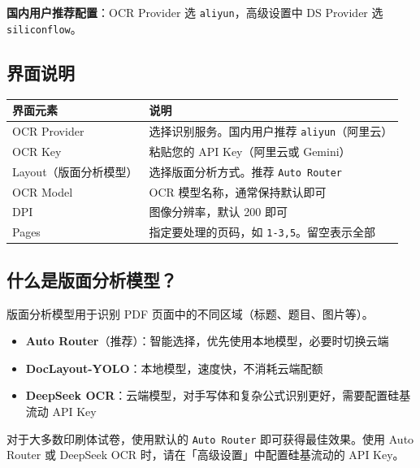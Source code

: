 \documentclass[UTF8,zihao=-4,openany]{ctexbook}
\begin{document}
\begin{TipBox}
	\textbf{国内用户推荐配置}：OCR Provider 选 \texttt{aliyun}，高级设置中 DS Provider 选 \texttt{siliconflow}。
\end{TipBox}

\subsection{界面说明}

\begin{center}
	\begin{tabular}{lp{9cm}}
		\toprule
		\textbf{界面元素}  & \textbf{说明}                        \\
		\midrule
		OCR Provider   & 选择识别服务。国内用户推荐 \texttt{aliyun}（阿里云） \\
		OCR Key        & 粘贴您的 API Key（阿里云或 Gemini）          \\
		Layout（版面分析模型） & 选择版面分析方式。推荐 \texttt{Auto Router}   \\
		OCR Model      & OCR 模型名称，通常保持默认即可                  \\
		DPI            & 图像分辨率，默认 200 即可                    \\
		Pages          & 指定要处理的页码，如 \texttt{1-3,5}。留空表示全部   \\
		\bottomrule
	\end{tabular}
\end{center}

\subsection{什么是版面分析模型？}

版面分析模型用于识别 PDF 页面中的不同区域（标题、题目、图片等）。

\begin{itemize}
	\item \textbf{Auto Router}（推荐）：智能选择，优先使用本地模型，必要时切换云端
	\item \textbf{DocLayout-YOLO}：本地模型，速度快，不消耗云端配额
	\item \textbf{DeepSeek OCR}：云端模型，对手写体和复杂公式识别更好，需要配置硅基流动 API Key
\end{itemize}

\begin{TipBox}
	对于大多数印刷体试卷，使用默认的 \texttt{Auto Router} 即可获得最佳效果。使用 Auto Router 或 DeepSeek OCR 时，请在「高级设置」中配置硅基流动的 API Key。
\end{TipBox}
\end{document}

